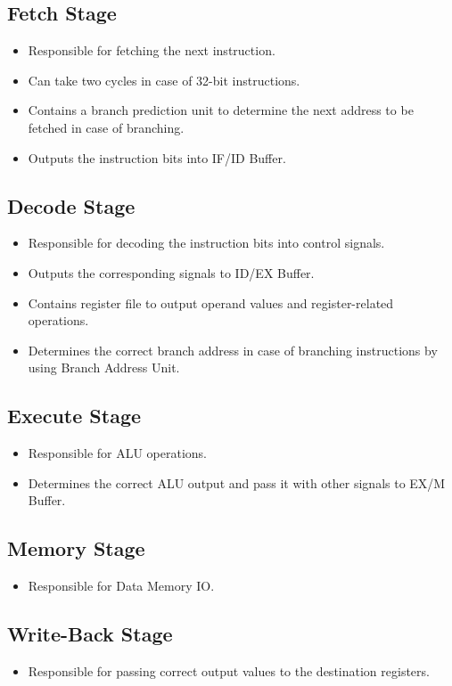 \documentclass[12pt]{report}
\begin{document}
\subsection{Fetch Stage}
\begin{itemize}
    \item Responsible for fetching the next instruction.
    \item Can take two cycles in case of 32-bit instructions.
    \item Contains a branch prediction unit to determine the next address to be fetched in case of branching.
    \item Outputs the instruction bits into IF/ID Buffer.
\end{itemize}

\subsection{Decode Stage}
\begin{itemize}
    \item Responsible for decoding the instruction bits into control signals.
    \item Outputs the corresponding signals to ID/EX Buffer.
    \item Contains register file to output operand values and register-related operations.
    \item Determines the correct branch address in case of branching instructions by using Branch Address Unit.
\end{itemize}

\subsection{Execute Stage}
\begin{itemize}
    \item Responsible for ALU operations.
    \item Determines the correct ALU output and pass it with other signals to EX/M Buffer.
\end{itemize}

\subsection{Memory Stage}
\begin{itemize}
    \item Responsible for Data Memory IO.
\end{itemize}

\subsection{Write-Back Stage}
\begin{itemize}
    \item Responsible for passing correct output values to the destination registers.
\end{itemize}
\end{document}
